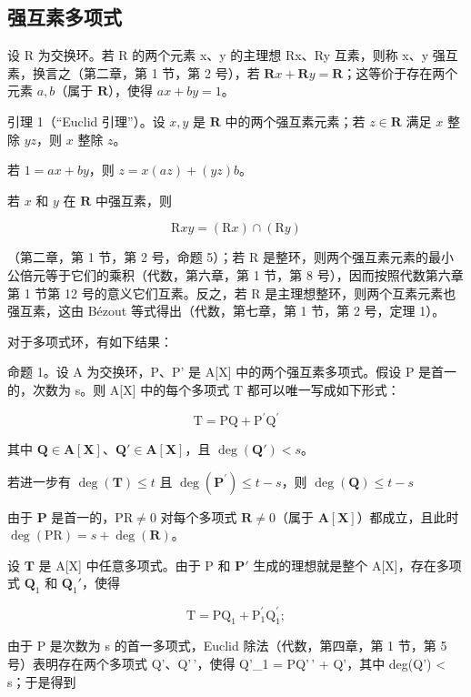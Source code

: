 \subsection{强互素多项式}

设 R 为交换环。若 R 的两个元素 x、y 的主理想 Rx、Ry 互素，则称 x、y 强互素，换言之（第二章，第 1 节，第 2 号），若 \(\mathbf{R}x + \mathbf{R}y = \mathbf{R}\)；这等价于存在两个元素 \(a, b\)（属于 \(\mathbf{R}\)），使得 \(ax + by = 1\)。

引理 1（“Euclid 引理”）。设 \(x, y\) 是 \(\mathbf{R}\) 中的两个强互素元素；若 \(z \in \mathbf{R}\) 满足 \(x\) 整除 \(yz\)，则 \(x\) 整除 \(z\)。

若 \(1 = ax + by\)，则 \(z = x(az) + (yz)b\)。

若 \(x\) 和 \(y\) 在 \(\mathbf{R}\) 中强互素，则

\[
\mathrm{R} x y = (\mathrm{R} x) \cap (\mathrm{R} y)
\]

（第二章，第 1 节，第 2 号，命题 5）；若 R 是整环，则两个强互素元素的最小公倍元等于它们的乘积（代数，第六章，第 1 节，第 8 号），因而按照代数第六章第 1 节第 12 号的意义它们互素。反之，若 R 是主理想整环，则两个互素元素也强互素，这由 Bézout 等式得出（代数，第七章，第 1 节，第 2 号，定理 1）。

对于多项式环，有如下结果：

命题 1。设 A 为交换环，P、P' 是 A{[}X{]} 中的两个强互素多项式。假设 P 是首一的，次数为 s。则 A{[}X{]} 中的每个多项式 T 都可以唯一写成如下形式：

\[
\mathrm{T} = \mathrm{PQ} + \mathrm{P} ^ {\prime} \mathrm{Q} ^ {\prime}\tag{1}
\]

其中 \(\mathbf{Q} \in \mathbf{A}[\mathbf{X}]\)、\(\mathbf{Q}' \in \mathbf{A}[\mathbf{X}]\)，且 \(\deg(\mathbf{Q}') < s\)。

若进一步有 \(\deg (\mathbf{T})\leqslant t\) 且 \(\deg (\mathbf{P}^{\prime})\leqslant t - s\)，则 \(\deg (\mathbf{Q})\leqslant t - s\)

由于 \(\mathbf{P}\) 是首一的，\(\mathrm{PR} \neq 0\) 对每个多项式 \(\mathbf{R} \neq 0\)（属于 \(\mathbf{A}[\mathbf{X}]\)）都成立，且此时 \(\deg(\mathrm{PR}) = s + \deg(\mathbf{R})\)。

设 \(\mathbf{T}\) 是 A{[}X{]} 中任意多项式。由于 P 和 \(\mathbf{P}'\) 生成的理想就是整个 A{[}X{]}，存在多项式 \(\mathbf{Q}_1\) 和 \(\mathbf{Q}_1'\)，使得

\[
\mathrm{T} = \mathrm{PQ} _ {1} + \mathrm{P} _ {1} ^ {\prime} \mathrm{Q} _ {1} ^ {\prime};
\]

由于 P 是次数为 s 的首一多项式，Euclid 除法（代数，第四章，第 1 节，第 5 号）表明存在两个多项式 Q'、Q'\,'，使得 Q'\_1 = PQ'\,' + Q'，其中 deg(Q') \textless{} s；于是得到

